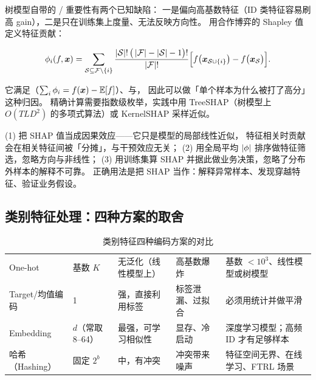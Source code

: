 树模型自带的 / 重要性有两个已知缺陷：
一是偏向高基数特征（ID 类特征容易刷高 gain），二是只在训练集上度量、无法反映方向性。
 用合作博弈的 Shapley 值 \cite{shapley1953value} 定义特征贡献：

\begin{equation}
\phi_i(f, \bm{x}) = \sum_{\mathcal{S} \subseteq \mathcal{F} \setminus \{i\}}
\frac{\left\lvert \mathcal{S} \right\rvert!\,\big(\left\lvert \mathcal{F} \right\rvert - \left\lvert \mathcal{S} \right\rvert - 1\big)!}{\left\lvert \mathcal{F} \right\rvert!}
\Big[f\big(\bm{x}_{\mathcal{S} \cup \{i\}}\big) - f\big(\bm{x}_{\mathcal{S}}\big)\Big] .
\label{eq:shapley}
\end{equation}

它满足（$\sum_i \phi_i = f(\bm{x}) - \operatorname{\mathbb{E}}[f]$）、与，
因此可以做「单个样本为什么被打了高分」这种归因。
精确计算需要指数级枚举，实践中用 TreeSHAP（树模型上 $O(TLD^2)$ 的多项式算法）或 KernelSHAP 采样近似。

\begin{pitfall}
(1) 把 SHAP 值当成因果效应——它只是模型的局部线性近似，
特征相关时贡献会在相关特征间被「分摊」，与干预效应无关；
(2) 用全局平均 $\left\lvert \phi \right\rvert$ 排序做特征筛选，忽略方向与非线性；
(3) 用训练集算 SHAP 并据此做业务决策，忽略了分布外样本的解释不可靠。
正确用法是把 SHAP 当作：解释异常样本、发现穿越特征、验证业务假设。
\end{pitfall}

\subsection{类别特征处理：四种方案的取舍}

\begin{table}[htbp]
\centering
\caption{类别特征四种编码方案的对比}
\label{tab:categorical}
\small
\begin{tabularx}{\textwidth}{L{2.0cm} L{1.9cm} L{2.0cm} L{1.5cm} Y}
\toprule
{} &  &  &  &  \\
\midrule
One-hot & 基数 $K$ & 无泛化（线性模型上） & 高基数爆炸 & 基数 $< 10^3$、线性模型或树模型 \\
\addlinespace
Target/均值编码 & 1 & 强，直接利用标签 & 标签泄漏、过拟合 & 必须用统计并做平滑 \\
\addlinespace
Embedding & $d$（常取 8--64） & 最强，可学习相似性 & 显存、冷启动 & 深度学习模型；高频 ID 才有足够样本 \\
\addlinespace
哈希（Hashing） & 固定 $2^b$ & 中，有冲突 & 冲突带来噪声 & 特征空间无界、在线学习、FTRL 场景 \\
\bottomrule
\end{tabularx}
\end{table}

